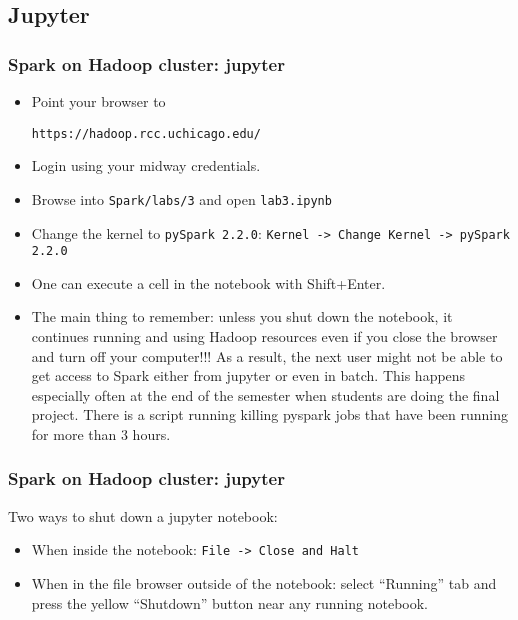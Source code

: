 \subsection{Jupyter}
\begin{frame}[fragile]
  \frametitle{Spark on Hadoop cluster: jupyter}
\begin{itemize}
\item Point your browser to
{\color{mycolorcli}
\begin{verbatim}
https://hadoop.rcc.uchicago.edu/
\end{verbatim}
}
\item Login using your midway credentials.
\item Browse into {\color{mycolorcli}\verb|Spark/labs/3|} and open {\color{mycolorcli}\verb|lab3.ipynb|}
\item Change the kernel to {\color{mycolorcli}\verb|pySpark 2.2.0|}: \verb|Kernel -> Change Kernel -> pySpark 2.2.0|
\item One can execute a cell in the notebook with Shift+Enter.
\item The main thing to remember: unless you shut down the notebook, it continues running and using Hadoop resources even if you
  close the browser and turn off your computer!!! As a result, the next user might not be able to get access to Spark either
  from jupyter or even in batch. This happens especially often at the end of the semester when students are doing the final project.
  There is a script running killing pyspark jobs that have been running for more than 3 hours.
\end{itemize}
\end{frame}

\begin{frame}[fragile]
  \frametitle{Spark on Hadoop cluster: jupyter}

Two ways to shut down a jupyter notebook:

\begin{itemize}
\item When inside the notebook: \verb|File -> Close and Halt|
\item When in the file browser outside of the notebook: select ``Running'' tab and press the yellow ``Shutdown'' button near
  any running notebook.
\end{itemize}
\end{frame}